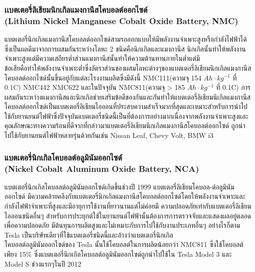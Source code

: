 \subsubsection*{เเบตเตอรี่ลิเธียมนิกเกิลแมงกานีสโคบอลต์ออกไซด์\\ (Lithium Nickel Manganese Cobalt Oxide Battery, NMC)}
	แบตเตอรี่นิกเกิลแมงกานีสโคบอลต์ออกไซด์สามรถออกแบบให้มีพลังงานจำเพาะสูงหรือกำลังไฟฟ้าได้ซึ่งเป็นผลดีมาจากการผสมกันระหว่างโลหะ 2 ชนิดคือนิกเกิลและแมงกานีส นิกเกิลนั้นทำให้พลังงานจำเพาะสูงแต่มีความเสถียรต่ำส่วนแมงกานีสนั้นทำให้ความต้านทานภายในต่ำแต่มี
	\\ข้อเสียคือทำให้พลังงานจำเพาะต่ำซึ่งอัตราส่วนของผสมโลหะต่างๆของแบตเตอรี่ลิเธียมนิกเกิลแมงกานีสโคบอลต์ออกไซด์นั้นขึ้นอยู่กับแต่ละโรงงานผลิตซึ่งมีดังนี้ NMC111(ความจุ 154 $Ah\cdot kg^{-1}$ ที่ 0.1C) NMC442 NMC622 และในปัจจุบัน NMC811(ความจุ > 185 $Ah\cdot kg^{-1}$ ที่ 0.1C)	
\newline\hspace*{2cm}การผสมกันระหว่างแมงกานีสและนิกเกิลช่วยเสริมข้อดีของกันและกันทำให้แบตเตอรี่ลิเธียมนิเกิลแมงกานีสโคบอลต์ออกไซด์เป็นแบตเตอรี่ลิเธียมไอออนที่ประสบความสำเร็จมากที่สุดและเหมาะสำหรับการนำไป
	ใช้กับยานยนต์ไฟฟ้าซึ่งปัจจุบันแบตเตอรี่ชนิดนี้เป็นที่ต้องการอย่างมากเนื่องจากพลังงานจำเพาะสูงและคุณลักษณะทางความร้อนที่ดีจากที่กล่าวมาแบตเตอรี่ลิเธียมนิกเกิลแมงกานีสโคบอลต์ออกไซด์
	ถูกนำไปใช้กับยานยนต์ไฟฟ้าหลายรุ่นด้วยกันเช่น Nissan Leaf, Chevy Volt, BMW i3
\subsubsection*{แบตเตอรี่นิกเกิลโคบอลต์อลูมินัมออกไซด์์\\ (Nickel Cobalt Aluminum Oxide Battery, NCA)}
แบตเตอรี่นิกเกิลโคบอลต์อลูมินัมออกไซด์เกิดขึ้นช่วงปี 1999 แบตเตอรี่ลิเธียมโคบอล-ต์อลูมินัมออกไซด์ มีความคล้ายคลึงกับแบตเตอรี่นิกเกิลแมงกานีสโคบอลต์ออกไซด์โดยให้พลังงานจำเพาะและกำลังไฟฟ้าจำเพาะที่สูงและมีอายุการใช้งานที่ยาวนานแต่ไม่ค่อยมี
ความปลอดภัยเท่ากับแบตเตอรี่ลิเธียมไอออนชนิดอื่นๆ สำหรับการประยุกต์ใช้ในยานยนต์ไฟฟ้านั้นต้องการการตรวจจับและแสดงผลอยู่ตลอดเพื่อความปลอดภัย มีต้นทุนการผลิตสูงและไม่เหมาะกับการไปใช้กับงานประเภทอื่นๆ
\newline\hspace*{2cm} 
อย่างไรก็ตาม Tesla เป็นบริษัทเดียวที่ใช้แบตเตอรี่ชนิดนี้และอ้างว่าแบตเตอรี่นิกเกิล\\โคบอลต์อลูมินัมออกไซด์ของ Tesla นั้นใช้โคบอลต์ในการผลิตน้อยกว่า NMC811 ซึ่งใช้โคบอลต์เพียง 15\% ซึ่งแบตเตอรี่นิกเกิลโคบอลต์อลูมินัมออกไซด์ถูกนำไปใช้ใน Tesla Model 3 และ Model S ช่วงแรกๆในปี 2012
